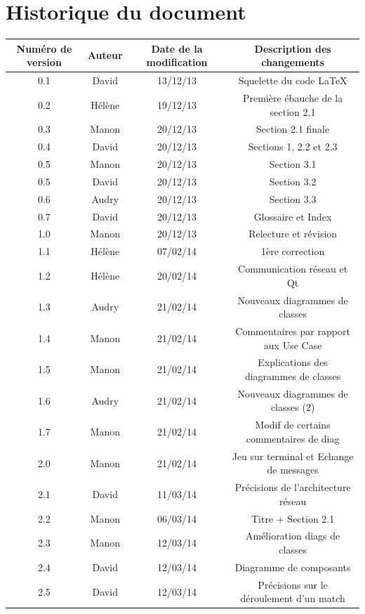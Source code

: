 \documentclass[a4paper,titlepage]{scrreprt}
\begin{document}
\section{Historique du document}
  \begin{tabular}{|c|c|c|c|}
    \hline
    Numéro de version & Auteur & Date de la modification & Description des changements \\
    \hline
    0.1 & David & 13/12/13 & Squelette du code \LaTeX \\
    0.2 & Hélène & 19/12/13 & Première ébauche de la section 2.1 \\
    0.3 & Manon & 20/12/13 & Section 2.1 finale \\
    0.4 & David & 20/12/13 & Sections 1,  2.2 et 2.3 \\
    0.5 & Manon & 20/12/13 & Section 3.1 \\
    0.5 & David & 20/12/13 & Section 3.2 \\
    0.6 & Audry & 20/12/13 & Section 3.3 \\
    0.7 & David & 20/12/13 & Glossaire et Index \\
    1.0 & Manon & 20/12/13 & Relecture et révision \\
    1.1 & Hélène & 07/02/14 & 1ère correction \\
    1.2 & Hélène & 20/02/14 & Communication réseau et Qt \\    
    1.3 & Audry & 21/02/14 & Nouveaux diagrammes de classes \\
    1.4 & Manon & 21/02/14 & Commentaires par rapport aux Use Case \\
    1.5 & Manon & 21/02/14 & Explications des diagrammes de classes \\
    1.6 & Audry & 21/02/14 & Nouveaux diagrammes de classes (2) \\
    1.7 & Manon & 21/02/14 & Modif de certains commentaires de diag \\
    2.0 & Manon & 21/02/14 & Jeu sur terminal et Echange de messages \\
    2.1 & David & 11/03/14 & Précisions de l'architecture réseau \\
    2.2 & Manon & 06/03/14 & Titre + Section 2.1 \\
    2.3 & Manon & 12/03/14 & Amélioration diags de classes \\
    2.4 & David & 12/03/14 & Diagramme de composants \\
    2.5 & David & 12/03/14 & Précisions sur le déroulement d'un match \\
    \hline
  \end{tabular}
\end{document}
